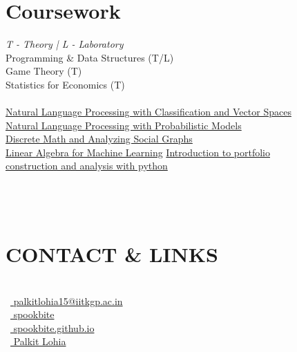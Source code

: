 \documentclass[]{deedy-resume-openfont}
\begin{document}
\begin{minipage}[t]{0.33\textwidth}
\section{Coursework}
\emph{T - Theory | L - Laboratory}\\
Programming \& Data Structures (T/L)\\
Game Theory (T)\\
Statistics for Economics (T)\\
\sectionsep
{}\\
\href{https://coursera.org/share/9a2868c911ab931492ad1bfc84b3ac75}{Natural Language Processing with Classification and Vector Spaces}\\
\href{https://coursera.org/share/b77c1d962643f8fa066ca076c3f3be10}{Natural Language Processing with Probabilistic Models}\\
\href{https://coursera.org/share/85611fef8e8312607c95a49a5a63fc87}{Discrete Math and Analyzing Social Graphs}\\
\href{https://coursera.org/share/b76987bf1b6c78e3745c91ced9492502}{Linear Algebra for Machine Learning}
\href{https://coursera.org/share/7446c90cce3eeb7deb317fd868c0fa4f}{Introduction to portfolio\\ construction and analysis with python}\\


\\~\\~\\

\section{CONTACT \& LINKS} 
\\
\faEnvelope\ {\href{mailto:palkitlohia15@iitkgp.ac.in}{ palkitlohia15@iitkgp.ac.in}}\\
\faGithub\ {\href{https://github.com/spookbite}{ spookbite}}\\
\faGlobe\ {\href{https://spookbite.github.io/}{ spookbite.github.io}}\\
\faLinkedinSquare\ {\href{https://www.linkedin.com/in/palkit-l-49aa66195/}{ Palkit Lohia}}\\
\\
\sectionsep
 \\~\\
 
%
%

\end{minipage} 
\end{document}
